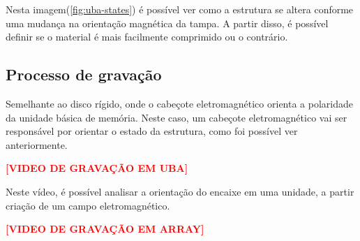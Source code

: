 Nesta imagem(\ref{fig:uba-states}) é possível ver como a estrutura se altera conforme uma mudança na orientação magnética da tampa. A partir disso, é possível definir se o material é mais facilmente comprimido ou o contrário.

\subsection{Processo de gravação}

Semelhante ao disco rígido, onde o cabeçote eletromagnético orienta a polaridade da unidade básica de memória. Neste caso, um cabeçote eletromagnético vai ser responsável por orientar o estado da estrutura, como foi possível ver anteriormente.

\begin{center}
\textcolor{red}{\textbf{[VIDEO DE GRAVAÇÃO EM UBA]}}
\end{center}

Neste vídeo, é possível analisar a orientação do encaixe em uma unidade, a partir criação de um campo eletromagnético.

\begin{center}
\textcolor{red}{\textbf{[VIDEO DE GRAVAÇÃO EM ARRAY]}}
\end{center}


